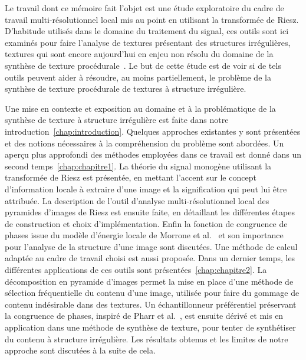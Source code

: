 \Conclusion \label{chap:conclusion}

Le travail dont ce mémoire fait l'objet est une étude exploratoire du cadre de travail multi-résolutionnel local mis au point en utilisant la transformée de Riesz. D'habitude utilisés dans le domaine du traitement du signal, ces outils sont ici examinés pour faire l'analyse de textures présentant des structures irrégulières, textures qui sont encore aujourd'hui en enjeu non résolu du domaine de la synthèse de texture procédurale~\cite{guehl_semi-procedural_2020}. Le but de cette étude est de voir si de tels outils peuvent aider à résoudre, au moins partiellement, le problème de la synthèse de texture procédurale de textures à structure irrégulière.

\bigskip

Une mise en contexte et exposition au domaine et à la problématique de la synthèse de texture à structure irrégulière est faite dans notre introduction~\ref{chap:introduction}. Quelques approches existantes y sont présentées et des notions nécessaires à la compréhension du problème sont abordées. Un aperçu plus approfondi des méthodes employées dans ce travail est donné dans un second temps~\ref{chap:chapitre1}. La théorie du signal monogène utilisant la transformée de Riesz est présentée, en mettant l'accent sur le concept d'information locale à extraire d'une image et la signification qui peut lui être attribuée. La description de l'outil d'analyse multi-résolutionnel local des pyramides d'images de Riesz est ensuite faite, en détaillant les différentes étapes de construction et choix d'implémentation. Enfin la fonction de congruence de phases issue du modèle d'énergie locale de Morrone et al.~\cite{morrone_mach_1986, morrone_feature_1987} et son importance pour l'analyse de la structure d'une image sont discutées. Une méthode de calcul adaptée au cadre de travail choisi est aussi proposée. Dans un dernier temps, les différentes applications de ces outils sont présentées~\ref{chap:chapitre2}. La décomposition en pyramide d'images permet la mise en place d'une méthode de sélection fréquentielle du contenu d'une image, utilisée pour faire du gommage de contenu indésirable dans des textures. Un échantillonneur préférentiel préservant la congruence de phases, inspiré de Pharr et al.~\cite{pharr_physically_2023}, est ensuite dérivé et mis en application dans une méthode de synthèse de texture, pour tenter de synthétiser du contenu à structure irrégulière. Les résultats obtenus et les limites de notre approche sont discutées à la suite de cela.

